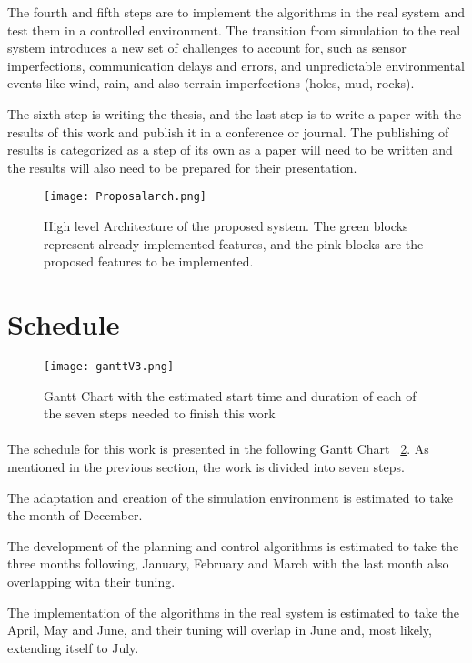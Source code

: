 The fourth and fifth steps are to implement the algorithms in the real system and test them in a controlled environment. The  
transition from simulation to the real system introduces a new set of challenges to account for, such as sensor imperfections, 
communication delays and errors, and unpredictable environmental events like wind, rain, and also terrain imperfections 
(holes, mud, rocks).

The sixth step is writing the thesis, and the last step is to write a paper with the results of this work and 
publish it in a conference or journal. The publishing of results is categorized as a step of its own as a paper 
will need to be written and the results will also need to be prepared for their presentation.
\clearpage

\begin{figure}[h]
    \centering
    \texttt{[image: Proposalarch.png]}
    \caption{High level Architecture of the proposed system. The green blocks represent already 
    implemented features, and the pink blocks are the proposed features to be implemented.}
    \label{fig:proposalarch}
\end{figure}


\section{Schedule}
\label{sec:schedule}
\begin{figure}[h]
    \centering
    \texttt{[image: ganttV3.png]}
    \caption{Gantt Chart with the estimated start time and duration of each of the seven steps needed to finish this work}
    \label{fig:schedule}
\end{figure}
\paragraph{}The schedule for this work is presented in the following Gantt Chart ~\ref{fig:schedule}. 
As mentioned in the previous section, the work is divided into seven steps. 

The adaptation and creation of the simulation environment is estimated to take the month of December. 

The development of the planning and control algorithms is estimated to take the 
three months following, January, February and March with the last month also overlapping with their tuning. 

The implementation of the algorithms in the real system is estimated to take the April, 
May and June, and their tuning will overlap in June and, most likely, extending itself to July. 

